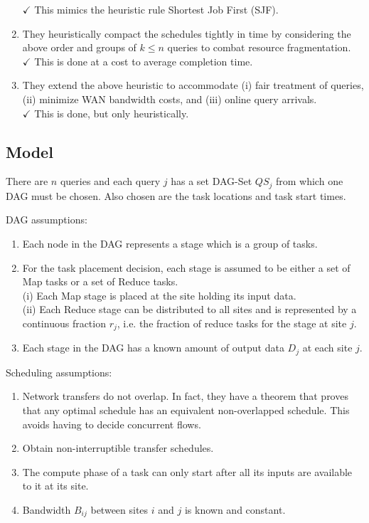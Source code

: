 \begin{enumerate}
	$\checkmark$ This mimics the heuristic rule Shortest Job First (SJF).
	\item They heuristically compact the schedules tightly in time by considering the above order and groups of $k\leq n$ queries to combat resource fragmentation. \\
	$\checkmark$ This is done at a cost to average completion time.
	\item They extend the above heuristic to accommodate (i) fair treatment of queries, (ii) minimize WAN bandwidth costs, and (iii) online query arrivals. \\
	$\checkmark$ This is done, but only heuristically.
\end{enumerate}

\subsection{Model}
There are $n$ queries and each query $j$ has a set DAG-Set $QS_j$ from which one DAG must be chosen.
Also chosen are the task locations and task start times.

DAG assumptions:
\begin{enumerate}
	\item Each node in the DAG represents a stage which is a group of tasks.
	\item For the task placement decision, each stage is assumed to be either a set of Map tasks or a set of Reduce tasks.
	 \\
	(i) Each Map stage is placed at the site holding its input data. \\
	(ii) Each Reduce stage can be distributed to all sites and is represented by a continuous fraction $r_j$, i.e. the fraction of reduce tasks for the stage at site $j$.
	\item Each stage in the DAG has a known amount of output data $D_j$ at each site $j$.
\end{enumerate}

Scheduling assumptions:
\begin{enumerate}
	\item Network transfers do not overlap.
	In fact, they have a theorem that proves that any optimal schedule has an equivalent non-overlapped schedule.
	This avoids having to decide concurrent flows.
	\item Obtain non-interruptible transfer schedules.
	\item The compute phase of a task can only start after all its inputs are available to it at its site.
	\item Bandwidth $B_{ij}$ between sites $i$ and $j$ is known and constant.
\end{enumerate}

